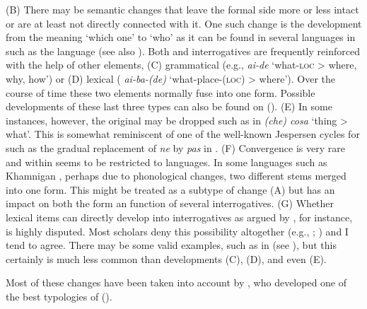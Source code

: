 (B) There may be semantic changes that leave the formal side more or less intact or are at least not directly connected with it. One such change is the development from the meaning ‘which one’ to ‘who’ as it can be found in several languages in  such as the  language  (see also \citealt{Idiatov2007}). Both  and interrogatives are frequently reinforced with the help of other elements, (C) grammatical (e.g.,  \textit{ai-de} ‘what-\textsc{loc} > where, why, how’) or (D) lexical ( \textit{ai-ba-(de)} ‘what-place-(\textsc{loc}) > where’). Over the course of time these two elements normally fuse into one form. Possible developments of these last three types can also be found on   (). (E) In some instances, however, the original  may be dropped such as in  \textit{(che) cosa} ‘thing > what’. This is somewhat reminiscent of one of the well-known Jespersen cycles for  such as the gradual replacement of \textit{ne} by \textit{pas} in . (F) Convergence is very rare and within  seems to be restricted to  languages. In some languages such as Khamnigan , perhaps due to phonological changes, two different  stems merged into one form. This might be treated as a subtype of change (A) but has an impact on both the form an function of several interrogatives. (G) Whether lexical items can directly develop into interrogatives as argued by \citet{Schulze2007}, for instance, is highly disputed. Most scholars deny this possibility altogether (e.g., \citealt{Diessel2003}; \citealt{CysouwHackstein2011}) and I tend to agree. There may be some valid examples, such as in  (see ), but this certainly is much less common than developments (C), (D), and even (E).

Most of these changes have been taken into account by \citet{MuyskenSmith1990}, who developed one of the best typologies of  ().

\begin{table}
\caption{The typology of interrogatives according to \citet{MuyskenSmith1990}}
\label{tab:4:12}
\end{table}

